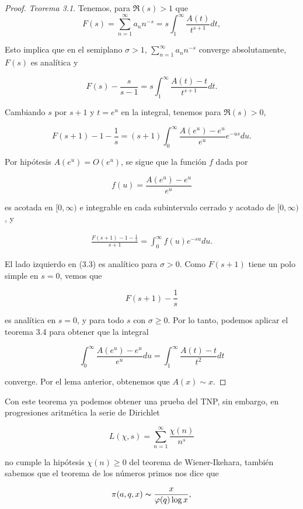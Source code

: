 \begin{proof}\textit{ Teorema 3.1}. Tenemos, para $\Re(s)>1$ que
\[
F(s)=\sum_{n=1}^{\infty}a_nn^{-s} =s \int_1^{\infty}\frac{A(t)}{t^{s+1}} d t,
\]

Esto implica que en el semiplano \( \sigma > 1 \), \(\displaystyle \sum_{n=1}^{\infty} a_n n^{-s} \) converge absolutamente, \( F(s) \) es analítica y  

\[
F(s) - \frac{s}{s-1} = s \int_1^{\infty} \frac{A(t)-t}{t^{s+1}} d t.
\]

Cambiando \( s \) por \( s+1 \) y \( t = e^u \) en la integral, tenemos para \( \Re(s) > 0 \),  

\[
F(s+1) - 1 - \frac{1}{s} = (s+1) \int_0^{\infty} \frac{A\left(e^u\right) - e^u}{e^u} e^{-u s} d u.
\]

Por hipótesis \( A\left(e^u\right) = O\left(e^u\right) \), se sigue que la función \( f \) dada por  

\[
f(u) = \frac{A\left(e^u\right) - e^u}{e^u}
\]

es acotada en \( [0, \infty) \) e integrable en cada subintervalo cerrado y acotado de \( [0, \infty) \), y  

\begin{align}
    \frac{F(s+1) - 1 - \frac{1}{s}}{s+1} = \int_0^{\infty} f(u) e^{-s u} d u.
\end{align}

El lado izquierdo en (3.3) es analítico para \( \sigma > 0 \). Como \( F(s+1) \) tiene un polo simple en \( s = 0 \), vemos que

 \[ F(s+1) - \dfrac{1}{s}\]

 es analítica en \( s = 0 \), y para todo \( s \) con \( \sigma \geq 0 \). Por lo tanto, podemos aplicar el teorema 3.4 para obtener que la integral  

\[
\int_0^{\infty} \frac{A\left(e^u\right) - e^u}{e^u} d u = \int_1^{\infty} \frac{A(t)-t}{t^2} d t
\]

converge. Por el lema anterior, obtenemos que \( A(x) \sim x \).
\end{proof}

Con este teorema ya podemos obtener una prueba del TNP, sin embargo, en progresiones aritmética la serie de Dirichlet 

$$L(\chi,s)=\sum_{n=1}^{\infty} \frac{\chi(n)}{n^s}$$

no cumple la hipótesis $\chi(n)\geq 0$ del teorema de Wiener-Ikehara, también sabemos que el teorema de los números primos nos dice que

$$\pi(a,q,x)\thicksim \frac{x}{\varphi(q)\log  x},$$

